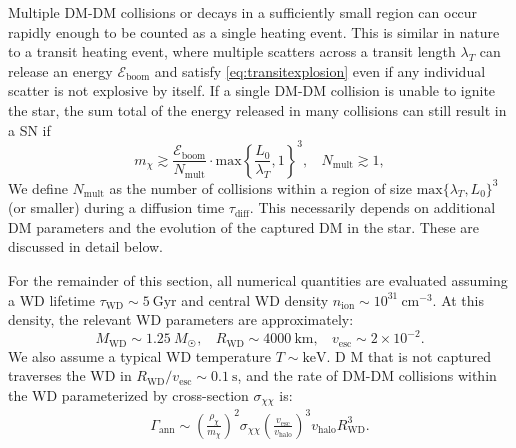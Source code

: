 \documentclass[preprintnumbers,amsmath,amssymb,prd,superscriptaddress]{revtex4}
\newcommand{\Eboom}{\mathcal{E}_\text{boom}}
\newcommand{\cm}{\text{cm}}
\def\r{\right)}
\def\l{\left(}
\begin{document}
Multiple DM-DM collisions or decays in a sufficiently small region can occur rapidly enough to be counted as a single heating event.
This is similar in nature to a transit heating event, where multiple scatters across a transit length $\lambda_T$ can release an energy $\Eboom$ and satisfy \eqref{eq:transitexplosion} even if any individual scatter is not explosive by itself.   
If a single DM-DM collision is unable to ignite the star, the sum total of the energy released in many collisions can still result in a SN if
\begin{equation}
\label{eq:multcolboom}
 m_\chi \gtrsim \frac{\Eboom}{N_\text{mult}} \cdot \text{max} \left \{\frac{L_0}{\lambda_T}, 1 \right \}^3, ~~~~ N_\text{mult} \gtrsim 1,
\end{equation}
We define $N_\text{mult}$ as the number of collisions within a region of size $\text{max}\{\lambda_T,L_0\}^3$ (or smaller) during a diffusion time $\tau_\text{diff}$.
This necessarily depends on additional DM parameters and the evolution of the captured DM in the star. 
These are discussed in detail below. 

For the remainder of this section, all numerical quantities are evaluated assuming a WD lifetime $\tau_\text{WD} \sim 5 ~\text{Gyr}$ and central WD density $n_\text{ion} \sim 10^{31} ~\cm^{-3}$. 
At this density, the relevant WD parameters are approximately: 
\begin{equation}
M_\text{WD} \sim 1.25 ~M_{\astrosun}, ~~~~ R_\text{WD} \sim 4000 ~\text{km}, ~~~~ v_\text{esc} \sim 2 \times 10^{-2}. 
\end{equation}
We also assume a typical WD temperature $T \sim \text{keV}$.
D
M that is not captured traverses the WD in $R_\text{WD}/v_\text{esc} \sim 0.1 ~\text{s}$, and the rate of DM-DM collisions within the WD parameterized by cross-section $\sigma_{\chi \chi}$ is:
\begin{align}
  \Gamma_\text{ann}
  \sim \l \frac{\rho_\chi}{m_\chi} \r^2 \sigma_{\chi \chi} \l \frac{v_\text{esc}}{v_\text{halo}}\r^3 v_\text{halo} R_\text{WD}^3. 
  \label{eq:collisionDM}
\end{align}
\end{document}

